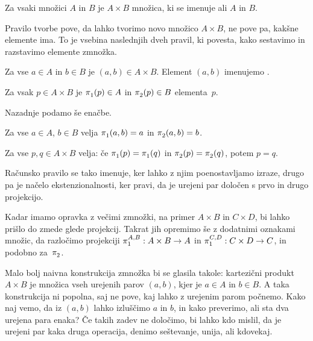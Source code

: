 \begin{pravilo}
  \label{pravilo:zmnozek-tvorba}
  Za vsaki množici $A$ in $B$ je $A \times B$ množica, ki se imenuje  ali
   $A$ in $B$.
\end{pravilo}

\noindent
%
Pravilo tvorbe pove, da lahko tvorimo novo množico $A \times B$, ne pove pa, kakšne
elemente ima. To je vsebina naslednjih dveh pravil, ki povesta, kako sestavimo in
razstavimo elemente zmnožka.

\begin{pravilo}
  \label{pravilo:zmnozek-vpeljava}
  Za vse $a \in A$ in $b \in B$ je $(a, b) \in A \times B$. Element $(a, b)$ imenujemo
  .
\end{pravilo}

\begin{pravilo}
  \label{pravilo:zmnozek-uporaba}
  Za vsak $p \in A \times B$ je $\fst(p) \in A$  in $\snd(p) \in B$
   elementa~$p$.
\end{pravilo}

Nazadnje podamo še enačbe.

\begin{pravilo}
  \label{pravilo:zmnozek-racunanje}
  Za vse $a \in A$, $b \in B$ velja $\fst(a, b) = a$ in $\snd(a, b) = b$.
\end{pravilo}

\begin{pravilo}
  \label{pravilo:zmnozek-ekstenzionalnost}
  Za vse $p, q \in A \times B$ velja: če $\fst(p) = \fst(q)$ in $\snd(p) = \snd(q)$,
  potem $p = q$.
\end{pravilo}

\noindent
%
Računsko pravilo se tako imenuje, ker lahko z njim poenostavljamo izraze, drugo pa je
načelo ekstenzionalnosti, ker pravi, da je urejeni par določen s prvo in drugo projekcijo.

Kadar imamo opravka z večimi zmnožki, na primer $A \times B$ in $C \times D$, bi lahko
prišlo do zmede glede projekcij. Takrat jih opremimo še z dodatnimi oznakami množic, da
razločimo projekciji $\fst[A][B] : A \times B \to A$ in $\fst[C][D] : C \times D \to C$,
in podobno za~$\snd$.

Malo bolj naivna konstrukcija zmnožka bi se glasila takole: kartezični produkt
$A \times B$ je množica vseh urejenih parov $(a, b)$, kjer je $a \in A$ in $b \in B$. A
taka konstrukcija ni popolna, saj ne pove, kaj lahko z urejenim parom počnemo. Kako naj
vemo, da iz $(a, b)$ lahko izluščimo $a$ in $b$, in kako preverimo, ali sta dva urejena
para enaka? Če takih zadev ne določimo, bi lahko kdo mislil, da je urejeni par kaka druga
operacija, denimo seštevanje, unija, ali kdovekaj.

